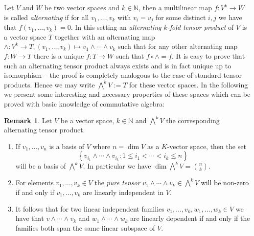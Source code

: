 \documentclass[
  paper=a4,
  DIV=14,
  fontsize=12pt,
  titlepage,
  bibliography=totoc,
  listof=totoc,
  pagesize=pdftex
]{scrartcl}
\numberwithin{figure}{section}
\numberwithin{equation}{section}
\numberwithin{table}{section}
\newcommand*\setN{\mathds{N}}
\theoremstyle{definition}
\newtheorem{remark}[definition]{Remark}
\numberwithin{definition}{section}
\begin{document}
Let $V$ and $W$ be two vector spaces and $k\in\setN$, then a multilinear map $f : V^k \to
W$ is called \emph{alternating} if for all $v_1, \dots, v_k$ with $v_i=v_j$ for some
distinct $i,j$ we have that $f(v_1, \dots, v_k) = 0$. In this setting an \emph{alternating
$k$-fold tensor product} of $V$ is a vector space $T$ together with an alternating map
$\wedge:V^k\to T, (v_1, \dots, v_k) \mapsto v_1\wedge\cdots\wedge v_k$ such that for any
other alternating map $f:W\to T$ there is a unique $\tilde f:T\to W$ such that $\tilde f
\circ \wedge = f$. It is easy to prove that such an alternating tensor product always
exists and is in fact unique up to isomorphism -- the proof is completely analogous to the
case of standard tensor products. Hence we may write $\bigwedge^k V := T$ for these vector
spaces. In the following we present some interesting and necessary properties of these
spaces which can be proved with basic knowledge of commutative algebra:

\begin{remark}
  Let $V$ be a vector space, $k \in \setN$ and $\bigwedge^k V$ the corresponding
  alternating tensor product.
  \begin{enumerate}
    \item If $v_1, \dots, v_n$ is a basis of $V$ where $n=\dim V$ as a $K$-vector space,
      then the set
      \[
        \left\{
          v_{i_1} \wedge \cdots \wedge v_{i_k} : 1\leq i_1 < \cdots < i_k \leq n
        \right\}
      \]
      will be a basis of $\bigwedge^kV$. In particular we have $\dim\bigwedge^kV = \binom
      nk$.
    \item For elements $v_1, \dots, v_k \in V$ the \emph{pure tensor} $v_1\wedge \cdots
      \wedge v_k \in \bigwedge^kV$ will be non-zero if and only if $v_1, \dots, v_k$ are
      linearly independent in $V$.
    \item It follows that for two linear independent families $v_1, \dots, v_k, w_1,
      \dots, w_k \in V$ we have that $v\wedge\cdots \wedge v_k$ and $w_1\wedge\cdots\wedge
      w_k$ are linearly dependent if and only if the families both span the same linear
      subspace of $V$.
  \end{enumerate}
\end{remark}
\end{document}

